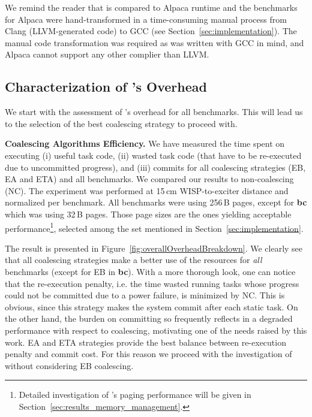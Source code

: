 We remind the reader that \sys is compared to Alpaca runtime and the benchmarks for Alpaca were hand-transformed in a time-consuming manual process from Clang (LLVM-generated code) to GCC (see Section~\ref{sec:implementation}). The manual code transformation was required as \sys was written with GCC in mind, and Alpaca cannot support any other complier than LLVM.


\subsection{Characterization of \sys's Overhead}
\label{sec:coala_overhead}

We start with the assessment of \sys's overhead for all benchmarks. This will lead us to the selection of the best coalescing strategy to proceed with.

\indent \textbf{Coalescing Algorithms Efficiency.} We have measured the time spent on executing (i) useful task code, (ii) wasted task code (that have to be re-executed due to uncommitted progress), and (iii) commits for all coalescing strategies (EB, EA and ETA) and all benchmarks. We compared our results to non-coalescing (NC). The experiment was performed at 15\,cm WISP-to-exciter distance and normalized per benchmark. All benchmarks were using 256\,B pages, except for \textbf{bc} which was using 32\,B pages. Those page sizes are the ones yielding acceptable performance\footnote{Detailed investigation of \sys's paging performance will be given in Section~\ref{sec:results_memory_management}.}, selected among the set mentioned in Section~\ref{sec:implementation}.

The result is presented in Figure~\ref{fig:overallOverheadBreakdown}. We clearly see that all coalescing strategies make a better use of the resources for \emph{all} benchmarks (except for EB in \textbf{bc}).
With a more thorough look, one can notice that the re-execution penalty, i.e. the time wasted running tasks whose progress could not be committed due to a power failure, is minimized by NC. This is obvious, since this strategy makes the system commit after each static task.
On the other hand, the burden on committing so frequently reflects in a degraded performance with respect to coalescing, motivating one of the needs raised by this work.
EA and ETA strategies provide the best balance between re-execution penalty and commit cost. For this reason we proceed with the investigation of \sys without considering EB coalescing.

